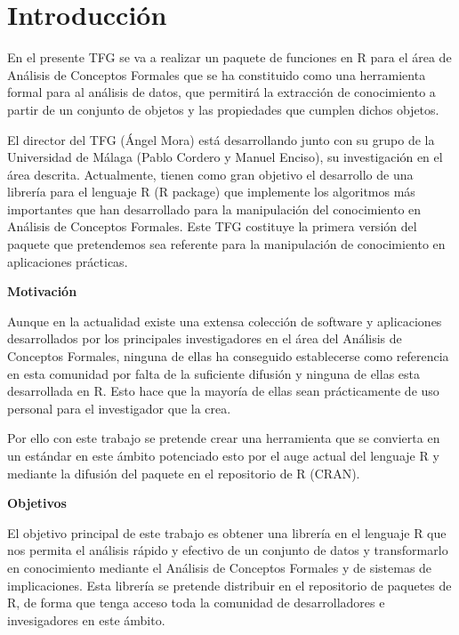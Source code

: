 \section{Introducci\'on}

En el presente TFG se va a realizar un paquete de funciones en R para el \'area de An\'alisis de Conceptos Formales que se ha constituido como una herramienta formal para al an\'alisis de datos, que permitir\'a la extracci\'on de conocimiento a partir de un conjunto de objetos y las propiedades que cumplen dichos objetos.

El director del TFG (\'Angel Mora) est\'a desarrollando junto con su grupo de la Universidad de M\'alaga (Pablo Cordero y Manuel Enciso), su investigaci\'on en el \'area descrita. Actualmente, tienen como gran objetivo el desarrollo de una librer\'ia para el lenguaje R (R package) que implemente los algoritmos m\'as importantes que han desarrollado para la manipulaci\'on del conocimiento en  An\'alisis de Conceptos Formales. Este TFG costituye la primera versi\'on del paquete que pretendemos sea referente para la manipulaci\'on de conocimiento en aplicaciones pr\'acticas.

\textbf{Motivaci\'on}

Aunque en la actualidad existe una extensa colecci\'on de software y aplicaciones desarrollados por los principales investigadores en el \'area del  An\'alisis de Conceptos Formales, ninguna de ellas ha conseguido establecerse como referencia en esta comunidad por falta de la suficiente difusi\'on y ninguna de ellas esta desarrollada en R. Esto hace que la mayor\'ia de ellas sean pr\'acticamente de uso personal para el investigador que la crea. 

Por ello con este trabajo se pretende crear una herramienta que se convierta en un est\'andar en este \'ambito potenciado esto por el auge actual del lenguaje R y mediante la difusi\'on del paquete en el repositorio de R (CRAN).


\textbf{Objetivos}

El objetivo principal de este trabajo es obtener una librer\'ia en el lenguaje R que nos permita el an\'alisis r\'apido y efectivo de un conjunto de datos y transformarlo en conocimiento mediante el An\'alisis de Conceptos Formales y de sistemas de implicaciones. Esta librer\'ia se pretende distribuir en el repositorio de paquetes de R, de forma que tenga acceso toda la comunidad de desarrolladores e invesigadores en este \'ambito.

\newpage
\thispagestyle{empty}
\mbox{}

\newpage